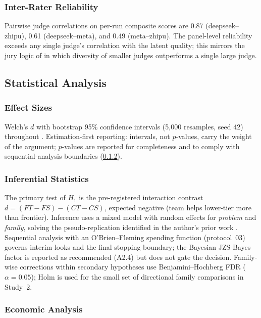 \documentclass[12pt,a4paper]{article}
\begin{document}
\subsubsection{Inter-Rater Reliability}

Pairwise judge correlations on per-run composite scores are 0.87
(deepseek--zhipu), 0.61 (deepseek--meta), and 0.49 (meta--zhipu). The
panel-level reliability exceeds any single judge's correlation with the latent
quality; this mirrors the jury logic of \citet{VergaEtAl2024} in which diversity
of smaller judges outperforms a single large judge.

\subsection{Statistical Analysis}

\subsubsection{Effect Sizes}

Welch's $d$ with bootstrap 95\% confidence intervals (5{,}000 resamples, seed
42) throughout \citep{Lakens2013}. Estimation-first reporting: intervals, not
$p$-values, carry the weight of the argument; $p$-values are reported for
completeness and to comply with sequential-analysis boundaries
(\cref{sec:inferential}).

\subsubsection{Inferential Statistics}\label{sec:inferential}

The primary test of $H_1$ is the pre-registered interaction contrast
$d = (FT - FS) - (CT - CS)$, expected negative (team helps lower-tier more than
frontier). Inference uses a mixed model with random effects for \emph{problem}
and \emph{family}, solving the pseudo-replication identified in the author's
prior work \citep{Hariri2026b}. Sequential analysis with an O'Brien--Fleming
spending function (protocol~03) governs interim looks and the final stopping
boundary; the Bayesian JZS Bayes factor is reported as recommended (A2.4) but
does not gate the decision. Family-wise corrections within secondary hypotheses
use Benjamini--Hochberg FDR ($\alpha = 0.05$); Holm is used for the small set of
directional family comparisons in Study~2.

\subsubsection{Economic Analysis}
\end{document}
